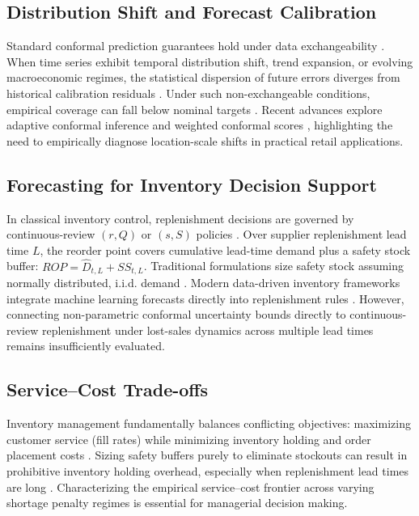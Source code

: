 \documentclass[11pt,a4paper]{article}
\begin{document}
\subsection{Distribution Shift and Forecast Calibration}
\label{sec:related_shift}
Standard conformal prediction guarantees hold under data exchangeability \cite{vovk2005algorithmic}. When time series exhibit temporal distribution shift, trend expansion, or evolving macroeconomic regimes, the statistical dispersion of future errors diverges from historical calibration residuals \cite{barber2023conformal, tibshirani2019conformal}. Under such non-exchangeable conditions, empirical coverage can fall below nominal targets \cite{barber2023conformal}. Recent advances explore adaptive conformal inference \cite{gibbs2021adaptive} and weighted conformal scores \cite{tibshirani2019conformal}, highlighting the need to empirically diagnose location-scale shifts in practical retail applications.

\subsection{Forecasting for Inventory Decision Support}
\label{sec:related_inventory}
In classical inventory control, replenishment decisions are governed by continuous-review $(r, Q)$ or $(s, S)$ policies \cite{silver1998inventory, axsaeter2015inventory, snyder2019fundamentals}. Over supplier replenishment lead time $L$, the reorder point covers cumulative lead-time demand plus a safety stock buffer: $ROP = \hat{D}_{t,L} + SS_{t,L}$. Traditional formulations size safety stock assuming normally distributed, i.i.d. demand \cite{silver1998inventory}. Modern data-driven inventory frameworks integrate machine learning forecasts directly into replenishment rules \cite{ban2019big, bertsimas2020predictive, huber2019integrating}. However, connecting non-parametric conformal uncertainty bounds directly to continuous-review replenishment under lost-sales dynamics across multiple lead times remains insufficiently evaluated.

\subsection{Service--Cost Trade-offs}
\label{sec:related_tradeoffs}
Inventory management fundamentally balances conflicting objectives: maximizing customer service (fill rates) while minimizing inventory holding and order placement costs \cite{silver1998inventory, snyder2019fundamentals, spanos2022application}. Sizing safety buffers purely to eliminate stockouts can result in prohibitive inventory holding overhead, especially when replenishment lead times are long \cite{malik2024sales}. Characterizing the empirical service--cost frontier across varying shortage penalty regimes is essential for managerial decision making.
\end{document}
